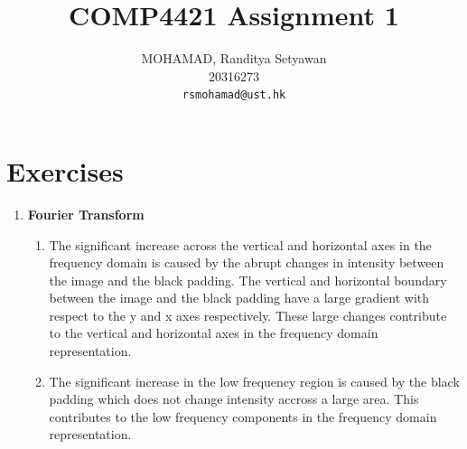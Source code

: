\documentclass[12pt,a4paper]{article}
\title{COMP4421 Assignment 1}
\author{MOHAMAD, Randitya Setyawan\\20316273\\ \texttt{rsmohamad@ust.hk}}
\begin{document}
	\maketitle
	
	\section{Exercises}
	\begin{enumerate}
		\item \textbf{Fourier Transform}
		\begin{enumerate}
			\item The significant increase across the vertical and horizontal axes in the frequency domain is caused by the abrupt changes in intensity between the image and the black padding. The vertical and horizontal boundary between the image and the black padding have a large gradient with respect to the y and x axes respectively. These large changes contribute to the vertical and horizontal axes in the frequency domain representation.
			\item The significant increase in the low frequency region is caused by the black padding which does not change intensity accross a large area. This contributes to the low frequency components in the frequency domain representation.
		\end{enumerate}
	\end{enumerate}

	\pagebreak
\end{document}
